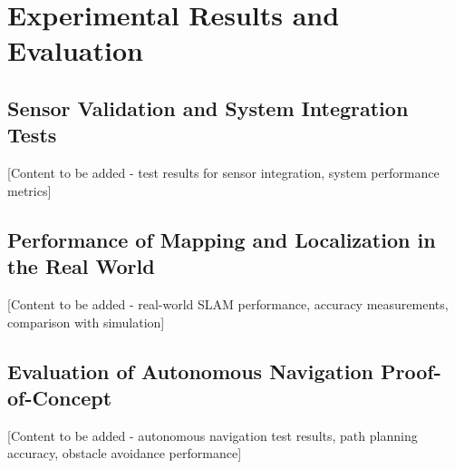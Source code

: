 \vspace{21.5pt}
\chapter{Experimental Results and Evaluation}

\section{Sensor Validation and System Integration Tests}

[Content to be added - test results for sensor integration, system performance metrics]

\section{Performance of Mapping and Localization in the Real World}

[Content to be added - real-world SLAM performance, accuracy measurements, comparison with simulation]

\section{Evaluation of Autonomous Navigation Proof-of-Concept}

[Content to be added - autonomous navigation test results, path planning accuracy, obstacle avoidance performance]
